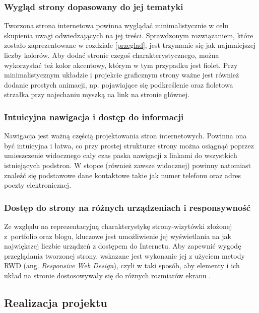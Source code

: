 \documentclass[a4paper, 12pt, twoside]{article}
\numberwithin{figure}{section}
\begin{document}
\begin{sloppypar}
\subsubsection*{Wygląd strony dopasowany do jej tematyki}

Tworzona strona internetowa powinna wyglądać minimalistycznie w celu skupienia uwagi odwiedzających na jej treści. Sprawdzonym rozwiązaniem, które zostało zaprezentowane w rozdziale \ref{przeglad}, jest trzymanie się jak najmniejszej liczby kolorów. Aby dodać stronie czegoś charakterystycznego, można wykorzystać też kolor akcentowy, którym w tym przypadku jest fiolet. Przy minimalistycznym układzie i projekcie graficznym strony ważne jest również dodanie prostych animacji, np. pojawiające się podkreślenie oraz fioletowa strzałka przy najechaniu myszką na link na stronie głównej. 

\subsubsection*{Intuicyjna nawigacja i dostęp do informacji}

Nawigacja jest ważną częścią projektowania stron internetowych. Powinna ona być intuicyjna i łatwa, co przy prostej strukturze strony można osiągnąć poprzez umieszczenie widocznego cały czas paska nawigacji z linkami do wszystkich istniejących podstron. W stopce (również zawsze widocznej) powinny natomiast znaleźć się podstawowe dane kontaktowe takie jak numer telefonu oraz adres poczty elektronicznej. 

\subsubsection*{Dostęp do strony na różnych urządzeniach i responsywność}

Ze względu na reprezentacyjną charakterystykę strony-wizytówki złożonej z~portfolio oraz blogu, kluczowe jest umożliwienie jej wyświetlania na jak największej liczbie urządzeń z dostępem do Internetu. Aby zapewnić wygodę przeglądania tworzonej strony, wskazane jest wykonanie jej z użyciem metody RWD (ang. \textit{Responsive Web Design}), czyli w taki sposób, aby elementy i ich układ na stronie dostosowywały się do różnych rozmiarów ekranu \cite{rwd}. 


\subsection{Realizacja projektu} \label{realizacja}


\end{sloppypar}
\end{document}
